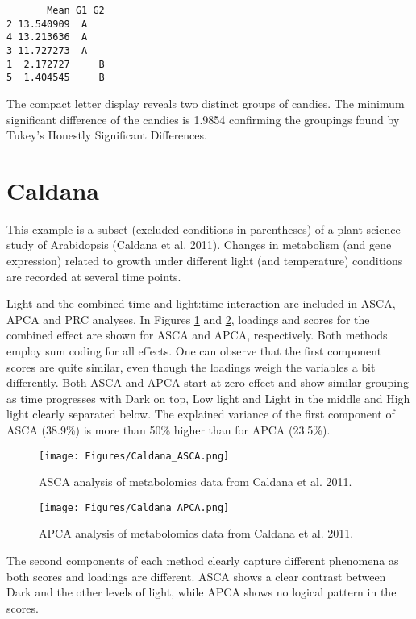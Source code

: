\begin{verbatim}
       Mean G1 G2
2 13.540909  A   
4 13.213636  A   
3 11.727273  A   
1  2.172727     B
5  1.404545     B
\end{verbatim}

The compact letter display reveals two distinct groups of candies. The minimum significant difference of the candies is 1.9854 confirming the groupings found by Tukey's Honestly Significant Differences.


\section{Caldana}

This example is a subset (excluded conditions in parentheses) of a plant science study of Arabidopsis (Caldana et al. 2011). Changes in metabolism (and gene expression) related to growth under different light (and temperature) conditions are recorded at several time points.

Light and the combined time and light:time interaction are included in ASCA, APCA and PRC analyses. In Figures \ref{FigChx:Caldana_ASCA} and \ref{FigChx:Caldana_APCA}, loadings and scores for the combined effect are shown for ASCA and APCA, respectively. Both methods employ sum coding for all effects. One can observe that the first component scores are quite similar, even though the loadings weigh the variables a bit differently. Both ASCA and APCA start at zero effect and show similar grouping as time progresses with Dark on top, Low light and Light in the middle and High light clearly separated below. The explained variance of the first component of ASCA (38.9\%) is more than 50\% higher than for APCA (23.5\%).

\begin{figure}[h!]
 \centering
 \texttt{[image: Figures/Caldana\_ASCA.png]}
 \caption{\footnotesize ASCA analysis of metabolomics data from Caldana et al. 2011.}
 \label{FigChx:Caldana_ASCA}
\end{figure}
\begin{figure}[h!]
 \centering
 \texttt{[image: Figures/Caldana\_APCA.png]}
 \caption{\footnotesize APCA analysis of metabolomics data from Caldana et al. 2011.}
 \label{FigChx:Caldana_APCA}
\end{figure}

The second components of each method clearly capture different phenomena as both scores and loadings are different. ASCA shows a clear contrast between Dark and the other levels of light, while APCA shows no logical pattern in the scores.

